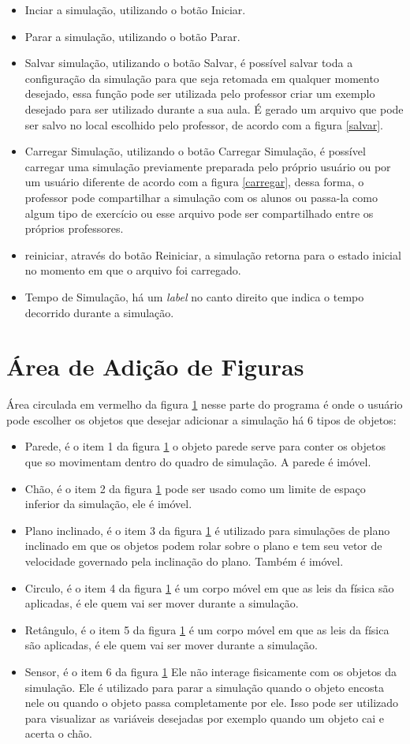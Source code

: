 \begin{itemize}
	\item Inciar a simulação, utilizando o botão Iniciar.
	\item Parar a simulação, utilizando o botão Parar.
	\item Salvar simulação, utilizando o botão Salvar, é possível salvar toda a configuração da simulação para que seja retomada em qualquer momento desejado, essa função pode ser utilizada pelo professor criar um exemplo desejado para ser utilizado durante a sua aula. É gerado um arquivo que pode ser salvo no local escolhido pelo professor, de acordo com a figura \ref{salvar}.
	\item Carregar Simulação, utilizando o botão Carregar Simulação, é possível carregar uma simulação previamente preparada pelo próprio usuário ou por um usuário diferente de acordo com a figura \ref{carregar}, dessa forma, o professor pode compartilhar a simulação com os alunos ou passa-la como algum tipo de exercício ou esse arquivo pode ser compartilhado entre os próprios professores.
	\item reiniciar, através do botão Reiniciar, a simulação retorna para o estado inicial no momento em que o arquivo foi carregado.
	\item Tempo de Simulação, há um \textit{label} no canto direito que indica o tempo decorrido durante a simulação.
\end{itemize}

\section{Área de Adição de Figuras}
Área circulada em vermelho da figura \ref{} nesse parte do programa é onde o usuário pode escolher os objetos que desejar adicionar a simulação há 6 tipos de objetos:
\begin{itemize}
	\item Parede, é o item 1 da figura \ref{} o objeto parede serve para conter os objetos que so movimentam dentro do quadro de simulação. A parede é imóvel.
	\item Chão, é o item 2 da figura \ref{} pode ser usado como um limite de espaço inferior da simulação, ele é imóvel.
	\item Plano inclinado, é o item 3 da figura \ref{}  é utilizado para simulações de plano inclinado em que os objetos podem rolar sobre o plano e tem seu vetor de velocidade governado pela inclinação do plano. Também é imóvel.
	\item Circulo, é o item 4 da figura \ref{} é um corpo móvel em que as leis da física são aplicadas, é ele quem vai ser mover durante a simulação.
	\item Retângulo, é o item 5 da figura \ref{} é um corpo móvel em que as leis da física são aplicadas, é ele quem vai ser mover durante a simulação.
	\item Sensor, é o item 6 da figura \ref{} Ele não interage fisicamente com os objetos da simulação. Ele é utilizado para parar a simulação quando o objeto encosta nele ou quando o objeto passa completamente por ele. Isso pode ser utilizado para visualizar as variáveis desejadas por exemplo quando um objeto cai e acerta o chão.
\end{itemize}

